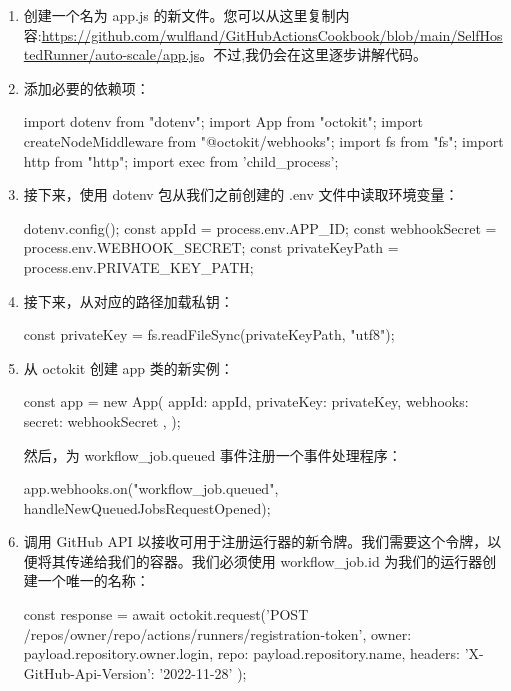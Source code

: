\begin{enumerate}
\item 
创建一个名为 app.js 的新文件。您可以从这里复制内容:\url{https://github.com/wulfland/GitHubActionsCookbook/blob/main/SelfHostedRunner/auto-scale/app.js}。不过,我仍会在这里逐步讲解代码。

\item 
添加必要的依赖项：

\begin{shell}
import dotenv from "dotenv";
import {App} from "octokit";
import {createNodeMiddleware} from "@octokit/webhooks";
import fs from "fs";
import http from "http";
import { exec } from 'child_process';
\end{shell}

\item 
接下来，使用 dotenv 包从我们之前创建的 .env 文件中读取环境变量：

\begin{shell}
dotenv.config();
const appId = process.env.APP_ID;
const webhookSecret = process.env.WEBHOOK_SECRET;
const privateKeyPath = process.env.PRIVATE_KEY_PATH;
\end{shell}

\item 
接下来，从对应的路径加载私钥：

\begin{shell}
const privateKey = fs.readFileSync(privateKeyPath, "utf8");
\end{shell}

\item 
从 octokit 创建 app 类的新实例：

\begin{shell}
const app = new App({
  appId: appId,
  privateKey: privateKey,
  webhooks: {
    secret: webhookSecret
  },
});
\end{shell}

然后，为 workflow\_job.queued 事件注册一个事件处理程序：

\begin{shell}
app.webhooks.on("workflow_job.queued", handleNewQueuedJobsRequestOpened);
\end{shell}

\item 
调用 GitHub API 以接收可用于注册运行器的新令牌。我们需要这个令牌，以便将其传递给我们的容器。我们必须使用 workflow\_job.id 为我们的运行器创建一个唯一的名称：

\begin{shell}
const response = await octokit.request('POST /repos/{owner}/{repo}/actions/runners/registration-token', { owner: payload.repository.owner.login,
  repo: payload.repository.name,
  headers: {
    'X-GitHub-Api-Version': '2022-11-28'
  }
});


\end{shell}
\end{enumerate}

